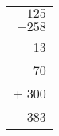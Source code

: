 \documentclass{standalone}
\begin{document}
\begin{tabular}{r}
$125$ \\
$+258$ \\ \hline
13 \\
70 \\
+ 300 \\ \hline
383 \\
\end{tabular}
\end{document}
